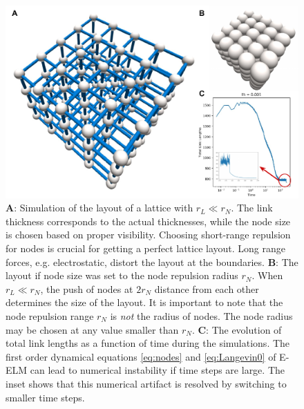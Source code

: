\documentclass[nofootinbib,preprint,floatfix,titlepage,endfloats]{revtex4} %
\begin{document}
\begin{figure}
    \centering
    \includegraphics[width=\columnwidth]{fig-09-19/lattice-2.pdf}
    \caption{{\bf A}: Simulation of the layout of a lattice with $r_L\ll r_N$. The link thickness corresponds to the actual thicknesses, while the node size is chosen based on proper visibility. Choosing short-range repulsion for nodes is crucial for getting a perfect lattice layout. Long range forces, e.g. electrostatic,  distort the layout at the boundaries. {\bf B}: The layout if node size was set to the node repulsion radius $r_N$. When $r_L\ll r_N$, the push of nodes at $2r_N$ distance from each other determines the size of the layout. It is important to note that the node repulsion range $r_N$ is {\em not} the radius of nodes. The node radius may be chosen at any value smaller than $ r_N$. {\bf C}: The evolution of total link lengths as a function of time during the simulations. The first order dynamical equations \ref{eq:nodes} and \ref{eq:Langevin0} of E-ELM can lead to numerical instability if time steps are large. The inset shows that this numerical artifact is resolved by switching to smaller time steps.}
    \label{fig:lattice}
    \vspace{4cm}
\end{figure}
\end{document}
